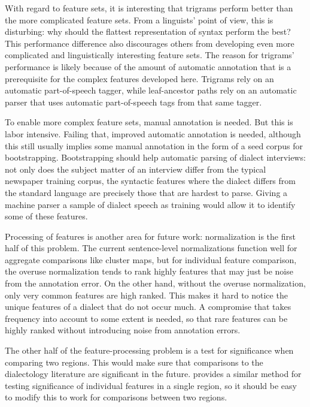 With regard to feature sets, it is interesting that trigrams perform better
than the more complicated feature sets. From a linguists' point of
view, this is disturbing: why should the flattest representation of
syntax perform the best? This performance difference also
discourages others from developing even more complicated and
linguistically interesting feature sets. The reason for trigrams'
performance is likely because of the amount of automatic annotation
that is a prerequisite for the complex features developed
here. Trigrams rely on an automatic part-of-speech tagger, while
leaf-ancestor paths rely on an automatic parser that uses automatic
part-of-speech tags from that same tagger.

To enable more complex feature sets, manual annotation is needed. But
this is labor intensive. Failing that, improved automatic annotation
is needed, although this still usually implies some manual annotation
in the form of a seed corpus for bootstrapping. Bootstrapping should
help automatic parsing of dialect interviews: not only does the
subject matter of an interview differ from the typical newspaper
training corpus, the syntactic features where the dialect differs from
the standard language are precisely those that are hardest to
parse. Giving a machine parser a sample of dialect speech as training
would allow it to identify some of these features.

Processing of features is another area for future work: normalization
is the first half of this problem. The current sentence-level
normalizations function well for aggregate comparisons like cluster
maps, but for individual feature comparison, the overuse normalization
tends to rank highly features that may just be noise from the
annotation error. On the other hand, without the overuse
normalization, only very common features are high ranked. This makes
it hard to notice the unique features of a dialect that do not occur
much. A compromise that takes frequency into account to some extent is
needed, so that rare features can be highly ranked without introducing
noise from annotation errors.

The other half of the feature-processing problem is a test for
significance when comparing two regions. This would make sure that
comparisons to the dialectology literature are significant in the
future.  provides a similar method for testing
significance of individual features in a single region, so it should
be easy to modify this to work for comparisons between two regions.

